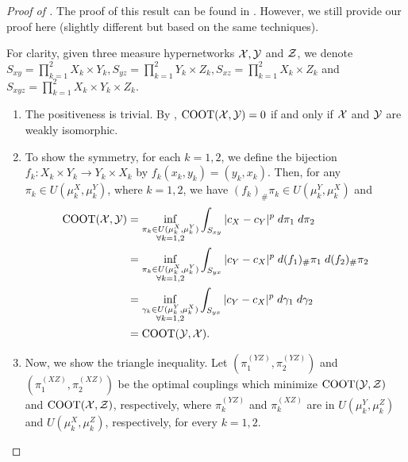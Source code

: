\begin{proof}[Proof of ]
  The proof of this result can be found in \citep{Chowdhury21b}.
  However, we still provide our proof here (slightly different but based on the same techniques).

  For clarity, given three measure hypernetworks $\mathcal X, \mathcal Y$ and $\mathcal Z$,
  we denote $S_{xy} = \prod_{k=1}^2 X_k \times Y_k, S_{yz} = \prod_{k=1}^2 Y_k \times Z_k,
  S_{xz} = \prod_{k=1}^2 X_k \times Z_k$ and $S_{xyz} = \prod_{k=1}^2 X_k \times Y_k \times Z_k$.
  \begin{enumerate}
    \item The positiveness is trivial. By ,
    $\text{COOT}(\mathcal X, \mathcal Y) = 0$ if and only if $\mathcal X$ and $\mathcal Y$ are weakly isomorphic.

    \item To show the symmetry, for each $k = 1, 2$, we define the bijection
    $f_k: X_k \times Y_k \to Y_k \times X_k$ by $f_k(x_k,y_k) = (y_k,x_k)$.
    Then, for any $\pi_k \in U(\mu_k^X, \mu_k^Y)$, where $k=1,2$, we have
    $(f_k)_{\#} \pi_k \in U(\mu_k^Y, \mu_k^X)$ and
    \begin{equation}
      \begin{split}
        \text{COOT}(\mathcal X, \mathcal Y) &= \inf_{\substack{\pi_k \in U(\mu^X_k, \mu^Y_k) \\
        \forall k = 1,2}} \int_{S_{xy}} \vert c_X - c_Y \vert^p \; d \pi_1 \; d \pi_2 \\
        &= \inf_{\substack{\pi_k \in U(\mu^X_k, \mu^Y_k) \\
        \forall k = 1,2}} \int_{S_{yx}} \vert c_Y - c_X \vert^p \; d (f_1)_{\#} \pi_1 \; d (f_2)_{\#} \pi_2 \\
        &= \inf_{\substack{\gamma_k \in U(\mu^Y_k, \mu^X_k) \\
        \forall k = 1,2}} \int_{S_{yx}} \vert c_Y - c_X \vert^p \; d \gamma_1 \; d \gamma_2 \\
        &= \text{COOT}(\mathcal Y, \mathcal X).
      \end{split}
    \end{equation}

    \item Now, we show the triangle inequality. Let $(\pi^{(YZ)}_1, \pi^{(YZ)}_2)$ and
    $(\pi^{(XZ)}_1, \pi^{(XZ)}_2)$ be the optimal couplings which minimize
    $\text{COOT}(\mathcal Y, \mathcal Z)$ and $\text{COOT}(\mathcal X, \mathcal Z)$, respectively, where
    $\pi^{(YZ)}_k$ and $\pi^{(XZ)}_k$ are in $U(\mu_k^Y, \mu_k^Z)$ and $U(\mu_k^X, \mu_k^Z)$,
    respectively, for every $k=1,2$.


\end{enumerate}
\end{proof}
